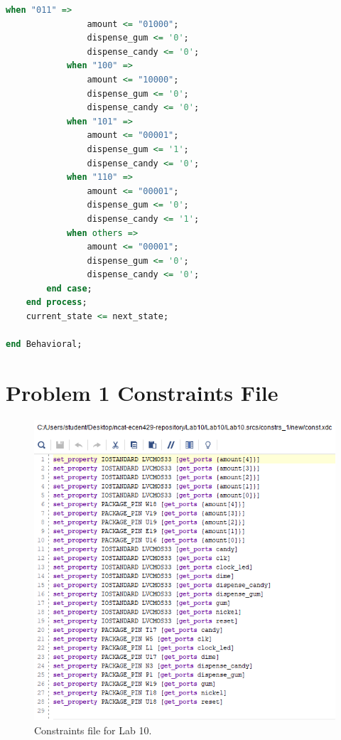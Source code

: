 \documentclass[11pt]{article}
\begin{document}
\begin{appendices}
\begin{lstlisting}[language=VHDL]
            when "011" =>
                amount <= "01000";
                dispense_gum <= '0';
                dispense_candy <= '0';
            when "100" =>
                amount <= "10000";
                dispense_gum <= '0';
                dispense_candy <= '0';
            when "101" =>
                amount <= "00001";
                dispense_gum <= '1';
                dispense_candy <= '0';
            when "110" =>
                amount <= "00001";
                dispense_gum <= '0';
                dispense_candy <= '1';
            when others =>
                amount <= "00001";
                dispense_gum <= '0';
                dispense_candy <= '0';
        end case;
    end process;
    current_state <= next_state;

end Behavioral;
\end{lstlisting}

\section{Problem 1 Constraints File}
\begin{center}
\begin{figure}[H]
	\includegraphics[scale=1]{./images/const.png}
	\caption{\label{fig:Prob1Const}Constraints file for Lab 10.}
\end{figure}
\end{center}

\end{appendices}
\end{document}
